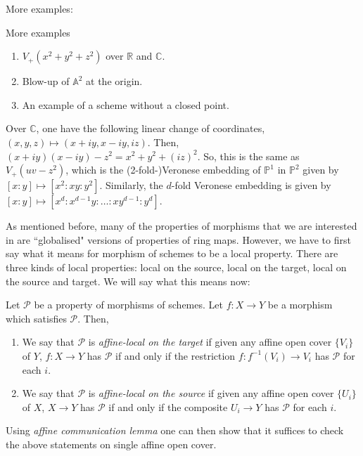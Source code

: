 \documentclass[ignorenonframetext,t]{beamer}
\newcommand{\A}{{\mathbb A}}
\newcommand{\C}{{\mathbb C}}
\renewcommand{\P}{{\mathbb P}}
\newcommand{\R}{{\mathbb R}}
\theoremstyle{definition}
\begin{document}
More examples:
\begin{frame}{More examples}
\begin{enumerate}
	\item $V_{+}(x^2+y^2+z^2)$ over $\R$ and $\C$. 
	\item Blow-up of $\A^2$ at the origin.
	\item An example of a scheme without a closed point.
\end{enumerate}
\end{frame}
 Over $\C$, one have the following linear change of coordinates, $(x,y,z)\mapsto (x+iy,x-iy,iz)$. Then, $(x+iy) (x-iy) -z^2= x^2+y^2+(iz)^2$. So, this is the same as $V_+(uv-z^2)$, which is the (2-fold-)Veronese embedding of $\P^1$ in $\P^2$ given by $[x:y]\mapsto [x^2:xy:y^2]$. Similarly, the $d$-fold Veronese embedding is given by $[x:y]\mapsto [x^d:x^{d-1}y:\ldots:xy^{d-1}:y^d]$.
 

As mentioned before, many of the properties of morphisms that we are interested in are ``globalised" versions of properties of ring maps. However, we have to first say what it means for morphism of schemes to be a local property. There are three kinds of local properties: local on the source, local on the target, local on the source and target. We will say what this means now:

\begin{frame}
\begin{definition}
	Let $\mathcal{P}$ be a property of morphisms of schemes. Let $f:X\rightarrow Y$ be a morphism which satisfies $\mathcal{P}$. Then,
	\begin{enumerate}
		\item We say that $\mathcal{P}$ is \textit{affine-local on the target} if given any affine open cover $\lbrace V_i\rbrace$ of $Y$, $f:X\rightarrow Y$ has $\mathcal{P}$ if and only if the restriction $f: f^{-1}(V_i)\rightarrow V_i$ has $\mathcal{P}$ for each $i$.
		\item We say that $\mathcal{P}$ is \textit{affine-local on the source} if given any affine open cover $\lbrace U_i\rbrace$ of $X$, $X\rightarrow Y$ has $\mathcal{P}$ if and only if the composite $U_i\rightarrow Y$ has $\mathcal{P}$ for each $i$.
	\end{enumerate}
\end{definition}

Using \textit{affine communication lemma} one can then show that it suffices to check the above statements on single affine open cover.

\end{frame}
\end{document}
